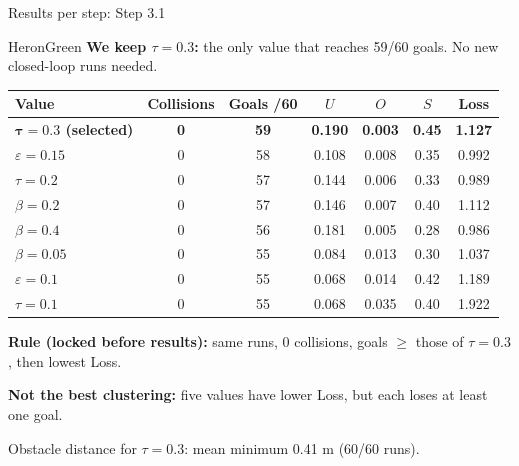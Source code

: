\documentclass[aspectratio=169,11pt]{beamer}
\begin{document}
\begin{frame}{Results per step: Step 3.1}
  \begin{statusbox}{HeronGreen}
    \footnotesize\textbf{We keep $\tau = 0.3$:} the only value that reaches 59/60 goals. No new closed-loop runs needed.
  \end{statusbox}
  \vspace{0.05cm}
  \scriptsize
  \renewcommand{\arraystretch}{1.08}
  \begin{tabularx}{\textwidth}{@{}Ycccccc@{}}
    \toprule
    \textbf{Value} & \textbf{Collisions} & \textbf{Goals /60} & $U$ & $O$ & $S$ & \textbf{Loss}\\
    \midrule
    \textbf{$\boldsymbol{\tau = 0.3}$ (selected)} & \textbf{0} & \textbf{59} & \textbf{0.190} & \textbf{0.003} & \textbf{0.45} & \textbf{1.127}\\
    $\varepsilon = 0.15$ & 0 & 58 & 0.108 & 0.008 & 0.35 & 0.992\\
    $\tau = 0.2$ & 0 & 57 & 0.144 & 0.006 & 0.33 & 0.989\\
    $\beta = 0.2$ & 0 & 57 & 0.146 & 0.007 & 0.40 & 1.112\\
    $\beta = 0.4$ & 0 & 56 & 0.181 & 0.005 & 0.28 & 0.986\\
    $\beta = 0.05$ & 0 & 55 & 0.084 & 0.013 & 0.30 & 1.037\\
    $\varepsilon = 0.1$ & 0 & 55 & 0.068 & 0.014 & 0.42 & 1.189\\
    $\tau = 0.1$ & 0 & 55 & 0.068 & 0.035 & 0.40 & 1.922\\
    \bottomrule
  \end{tabularx}

  \vspace{0.08cm}
  {\scriptsize \textbf{Rule (locked before results):} same runs, 0 collisions, goals $\geq$ those of $\tau = 0.3$, then lowest Loss.\par
  \textbf{Not the best clustering:} five values have lower Loss, but each loses at least one goal.\par
  Obstacle distance for $\tau = 0.3$: mean minimum 0.41 m (60/60 runs).\par}
\end{frame}
\end{document}
